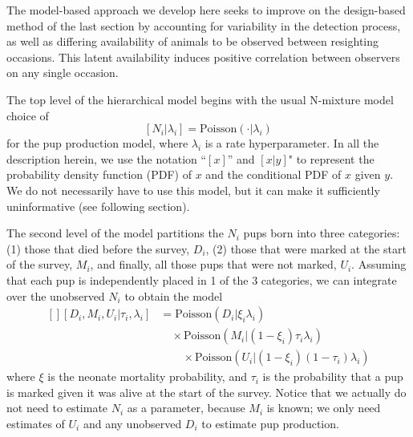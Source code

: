 \documentclass[fleqn,10pt]{wlscirep}
\begin{document}
{The model-based approach we develop here seeks to improve on the design-based method of the last section by accounting for variability in the detection process, as well as differing availability of animals to be observed between resighting occasions. This latent availability induces positive correlation between observers on any single occasion.

The top level of the hierarchical model begins with the usual N-mixture model choice of
\[
[N_i|\lambda_i] = \text{Poisson}(\cdot|\lambda_i)
\]
for the pup production model, where \(\lambda_i\) is a rate hyperparameter. In all the description herein, we use the notation ``\([x]\)'' and \([x|y]\)" to represent the probability density function (PDF) of \(x\) and the conditional PDF of \(x\) given \(y\). We do not necessarily have to use this model, but it can make it sufficiently uninformative (see following section).

The second level of the model partitions the \(N_i\) pups born into three categories: (1) those that died before the survey, \(D_i\), (2) those that were marked at the start of the survey, \(M_i\), and finally, all those pups that were not marked, \(U_i\). Assuming that each pup is independently placed in 1 of the 3 categories, we can integrate over the unobserved \(N_i\) to obtain the model
\[
\begin{aligned}[]
[D_i, M_i, U_i|\tau_i,\lambda_i] &= \text{Poisson}(D_i|\xi_i\lambda_i) \\ & \quad \times\text{Poisson}(M_i|(1-\xi_i)\tau_i\lambda_i)\\
&\qquad \times \text{Poisson}(U_i|(1-\xi_i)(1-\tau_i)\lambda_i)
\end{aligned}
\]
where \(\xi\) is the neonate mortality probability, and \(\tau_i\) is the probability that a pup is marked given it was alive at the start of the survey. Notice that we actually do not need to estimate \(N_i\) as a parameter, because \(M_i\) is known; we only need estimates of \(U_i\) and any unobserved \(D_i\) to estimate pup production.

}
\end{document}
